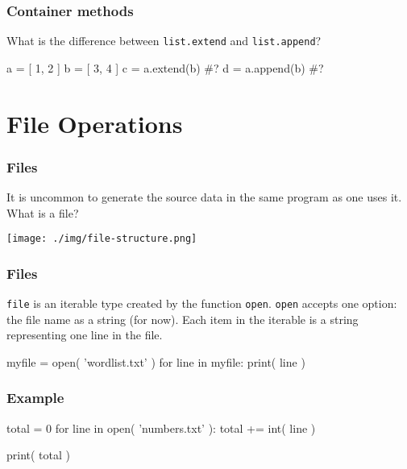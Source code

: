 \documentclass[11pt]{beamer}
\begin{document}
\begin{frame}[fragile]
  \frametitle{Container methods}
  \Enlarge

  \begin{itemize}
  \myitem  What is the difference between \texttt{list.extend} and \texttt{list.append}?
  \end{itemize}
  \begin{semiverbatim}
a = [ 1, 2 ]
b = [ 3, 4 ]
c = a.extend(b)  #?
d = a.append(b)  #?
  \end{semiverbatim}
\end{frame}

\section{File Operations}

\begin{frame}[fragile]
  \frametitle{Files}
  \Enlarge

  \begin{itemize}
  \myitem  It is uncommon to generate the source data in the same program as one uses it.
  \myitem  What is a file?
  \end{itemize}
  \texttt{[image: ./img/file-structure.png]}
\end{frame}

\begin{frame}[fragile]
  \frametitle{Files}
  \Enlarge

  \begin{itemize}
  \myitem  \texttt{file} is an iterable type created by the function \texttt{open}.
  \myitem  \texttt{open} accepts one option:  the file name as a string (for now).
  \myitem  Each item in the iterable is a string representing one line in the file.
  \end{itemize}
  \begin{semiverbatim}
myfile = open( 'wordlist.txt' )
for line in myfile:
    print( line )
  \end{semiverbatim}
\end{frame}

\begin{frame}[fragile]
  \frametitle{Example}
  \Enlarge

  \begin{semiverbatim}
total = 0
for line in open( 'numbers.txt' ):
    total += int( line )

print( total )
  \end{semiverbatim}
\end{frame}
\end{document}
